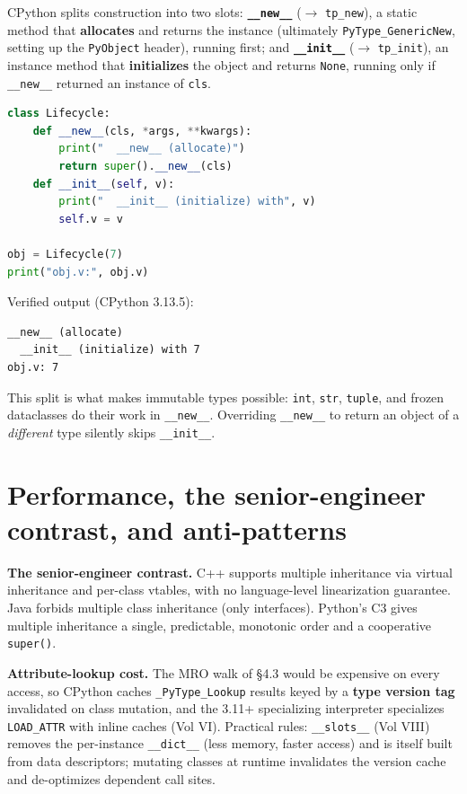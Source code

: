 CPython splits construction into two slots: \textbf{\texttt{\_\_new\_\_}} ($\rightarrow$
\texttt{tp\_new}), a static method that \textbf{allocates} and returns the instance (ultimately
\texttt{PyType\_GenericNew}, setting up the \texttt{PyObject} header), running first; and
\textbf{\texttt{\_\_init\_\_}} ($\rightarrow$ \texttt{tp\_init}), an instance method that
\textbf{initializes} the object and returns \texttt{None}, running only if \texttt{\_\_new\_\_}
returned an instance of \texttt{cls}.

\begin{lstlisting}[language=Python, caption={\_\_new\_\_ allocates and runs first; \_\_init\_\_ initializes after.}]
class Lifecycle:
    def __new__(cls, *args, **kwargs):
        print("  __new__ (allocate)")
        return super().__new__(cls)
    def __init__(self, v):
        print("  __init__ (initialize) with", v)
        self.v = v

obj = Lifecycle(7)
print("obj.v:", obj.v)
\end{lstlisting}

Verified output (CPython 3.13.5):

\begin{lstlisting}[caption={Output}]
  __new__ (allocate)
  __init__ (initialize) with 7
obj.v: 7
\end{lstlisting}

This split is what makes immutable types possible: \texttt{int}, \texttt{str}, \texttt{tuple},
and frozen dataclasses do their work in \texttt{\_\_new\_\_}. Overriding \texttt{\_\_new\_\_} to
return an object of a \emph{different} type silently skips \texttt{\_\_init\_\_}.

\section{Performance, the senior-engineer contrast, and anti-patterns}

\textbf{The senior-engineer contrast.} C++ supports multiple inheritance via virtual
inheritance and per-class vtables, with no language-level linearization guarantee. Java forbids
multiple class inheritance (only interfaces). Python's C3 gives multiple inheritance a single,
predictable, monotonic order and a cooperative \texttt{super()}.

\textbf{Attribute-lookup cost.} The MRO walk of §4.3 would be expensive on every access, so
CPython caches \texttt{\_PyType\_Lookup} results keyed by a \textbf{type version tag}
invalidated on class mutation, and the 3.11+ specializing interpreter specializes
\texttt{LOAD\_ATTR} with inline caches (Vol VI). Practical rules: \texttt{\_\_slots\_\_}
(Vol VIII) removes the per-instance \texttt{\_\_dict\_\_} (less memory, faster access) and is
itself built from data descriptors; mutating classes at runtime invalidates the version cache
and de-optimizes dependent call sites.

